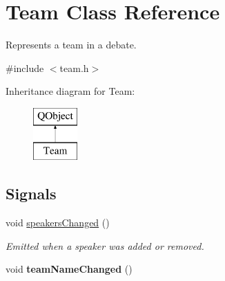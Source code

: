 \hypertarget{classTeam}{\section{Team Class Reference}
\label{classTeam}
}


Represents a team in a debate.  




{\ttfamily \#include $<$team.\-h$>$}

Inheritance diagram for Team\-:\begin{figure}[H]
\begin{center}
\leavevmode
\includegraphics[height=2.000000cm]{classTeam}
\end{center}
\end{figure}
\subsection*{Signals}
\begin{DoxyCompactItemize}
\item 
\hypertarget{classTeam_a29e138b413efaefa54d7e0c36a397ace}{void \hyperlink{classTeam_a29e138b413efaefa54d7e0c36a397ace}{speakers\-Changed} ()}\label{classTeam_a29e138b413efaefa54d7e0c36a397ace}

\begin{DoxyCompactList}\small\item\em Emitted when a speaker was added or removed. \end{DoxyCompactList}\item 
\hypertarget{classTeam_aefee2bc5f2ca783dfe4ab63a4926128d}{void {\bfseries team\-Name\-Changed} ()}\label{classTeam_aefee2bc5f2ca783dfe4ab63a4926128d}

\end{DoxyCompactItemize}
